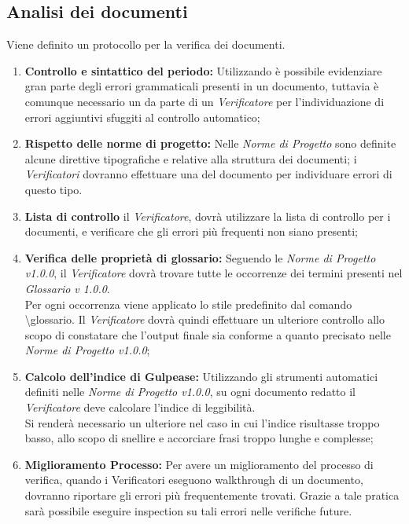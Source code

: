 \subsection{Analisi dei documenti}
Viene definito un protocollo per la verifica dei documenti.
\begin{enumerate}
	\item \textbf{Controllo e sintattico del periodo:} Utilizzando  è possibile evidenziare gran parte degli errori grammaticali presenti in un documento, tuttavia è comunque necessario un  da parte di un \textit{Verificatore} per l'individuazione di errori aggiuntivi sfuggiti al controllo automatico;
	\item \textbf{Rispetto delle norme di progetto:} Nelle \textit{Norme di Progetto} sono definite alcune direttive tipografiche e relative alla struttura dei documenti;
	i \textit{Verificatori} dovranno effettuare una  del documento per individuare errori di questo tipo.
	\item \textbf{Lista di controllo} il \textit{Verificatore}, dovrà utilizzare la lista di controllo per i documenti, e verificare che gli errori più frequenti non siano presenti;
	\item \textbf{Verifica delle proprietà di glossario:} Seguendo le \textit{Norme di Progetto v1.0.0}, il \textit{Verificatore} dovrà trovare tutte le occorrenze dei termini presenti nel \textit{Glossario v 1.0.0}.\\
	Per ogni occorrenza viene applicato lo stile  predefinito dal comando \textbackslash glossario.
	Il \textit{Verificatore} dovrà quindi effettuare un ulteriore controllo allo scopo di constatare che l’output finale sia conforme a quanto precisato nelle \textit{Norme di Progetto v1.0.0};
	\item \textbf{Calcolo dell'indice di Gulpease:} Utilizzando gli strumenti automatici definiti nelle \textit{Norme di Progetto v1.0.0}, su ogni documento redatto il \textit{Verificatore} deve calcolare l’indice di leggibilità.\\
	Si renderà necessario un ulteriore  nel caso in cui l’indice risultasse troppo basso, allo scopo di snellire e accorciare frasi troppo lunghe e complesse;
	\item \textbf{Miglioramento Processo:} Per avere un miglioramento del processo di verifica, quando i Verificatori eseguono
	walkthrough di un documento, dovranno riportare gli errori più frequentemente
	trovati. Grazie a tale pratica sarà possibile eseguire inspection su tali errori nelle
	verifiche future.
	
\end{enumerate}



